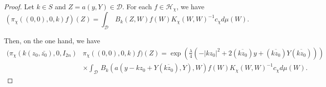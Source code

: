 \documentclass[12pt]{amsart}
\numberwithin{equation}{section}
\begin{document}
\begin{proof} Let $k\in S$ and $Z=a(y,Y)\in  {\mathcal D}$. For each 
$f\in {\mathcal H}_{\chi}$, we have
\begin{equation*}(\pi_{\chi}((0,0),0,k)f)(Z)=
\int_{\mathcal D}\,B_k(Z,W)f(W)
K_{\chi}(W,W)^{-1}c_{\chi}d\mu (W).\end{equation*}

Then, on the one hand, we have
\begin{align*}(\pi_{\chi}(k(z_0,\bar{z_0}),0,I_{2n})&\pi_{\chi}((0,0),0,k)f)(Z)=
\exp \left(  \tfrac{\lambda}{4}\left(-\vert kz_0\vert^2+2(\overline{kz_0})y+
(\overline{kz_0})Y(\overline{kz_0})\right)\right)\\ 
&\times \int_{\mathcal D}\,B_k(a(y-kz_0+Y(\overline{kz_0}),Y),W)f(W)
K_{\chi}(W,W)^{-1}c_{\chi}d\mu (W). \end{align*}


\end{proof}
\end{document}
